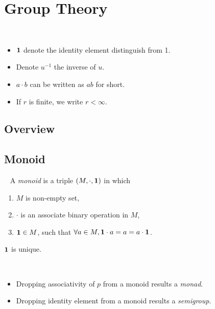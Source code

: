 \setcounter{chapter}{0}
\chapter{Group Theory}

\begin{notation} ~
\begin{itemize}
    \item $\mathbf{1}$ denote the identity element distinguish from 1.
    \item Denote $u^{-1}$ the inverse of $u$.
    \item $a \cdot b$ can be written as $ab$ for short.
    \item If $r$ is finite, we write $r < \infty$.
\end{itemize}
\end{notation}
\setcounter{section}{-1}

\section{Overview} \label{sec:}



\newpage
\section{Monoid} \label{sec:}

\begin{definition}[Monoid]~
A \textit{monoid} is a triple $(M, \cdot, \mathbf{1})$ in which
\begin{enumerate}
    \item $M$ is non-empty set,
    \item $\cdot$ is an associate binary operation in $M$,
    \item $\mathbf{1} \in M$, such that $\forall a \in M, \mathbf{1} \cdot a = a = a \cdot \mathbf{1}$.
\end{enumerate}
\end{definition}
\begin{remark}
$\mathbf{1}$ is unique.
\end{remark}

\begin{definition} ~
    \begin{itemize}
        \item Dropping associativity of $p$ from a monoid results a \textit{monad}.
        \item Dropping identity element from a monoid results a \textit{semigroup}.
    \end{itemize}
\end{definition}

